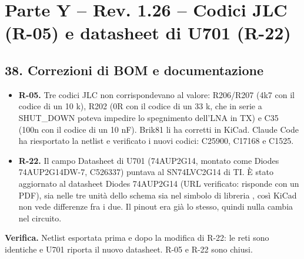 \clearpage
\section[Parte Y – Rev. 1.26 – Codici JLC (R-05) e datasheet di U701 (R-22)]{Parte Y – Rev. 1.26 – Codici JLC (R-05) e datasheet di U701 (R-22)}

\subsection[38. Correzioni di BOM e documentazione]{38. Correzioni di BOM e documentazione}

\begin{itemize}
\item \textbf{R-05.} Tre codici JLC non corrispondevano al valore: R206/\allowbreak{}R207 (4k7 con il codice di un 10 k), R202 (0R con il codice di un 33 k, che in serie a SHUT\_\allowbreak{}DOWN poteva impedire lo spegnimento dell'LNA in TX) e C35 (100n con il codice di un 10 nF). Brik81 li ha corretti in KiCad. Claude Code ha riesportato la netlist e verificato i nuovi codici: C25900, C17168 e C1525.
\item \textbf{R-22.} Il campo Datasheet di U701 (74AUP2G14, montato come Diodes 74AUP2G14DW-7, C526337) puntava al SN74LVC2G14 di TI. È stato aggiornato al datasheet Diodes 74AUP2G14 (URL verificato: risponde con un PDF), sia nelle tre unità dello schema sia nel simbolo di libreria , così KiCad non vede differenze fra i due. Il pinout era già lo stesso, quindi nulla cambia nel circuito.
\end{itemize}

\textbf{Verifica.} Netlist esportata prima e dopo la modifica di R-22: le reti sono identiche e U701 riporta il nuovo datasheet. R-05 e R-22 sono chiusi.
